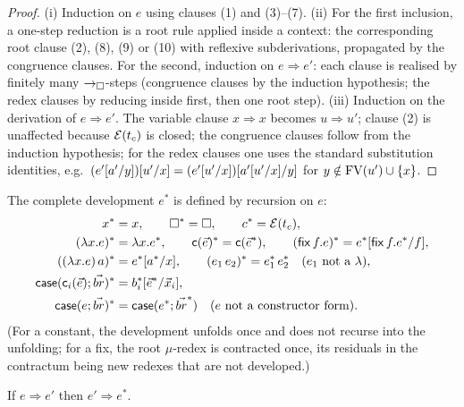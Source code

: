 \begin{proof}
(i) Induction on $e$ using clauses (1) and (3)--(7).  (ii) For the first
inclusion, a one-step reduction is a root rule applied inside a context:
the corresponding root clause (2), (8), (9) or (10) with reflexive
subderivations, propagated by the congruence clauses.  For the second,
induction on $e \Rightarrow e'$: each clause is realised by finitely
many $\rightarrow_{\square}$-steps (congruence clauses by the induction hypothesis; the
redex clauses by reducing inside first, then one root step).  (iii)
Induction on the derivation of $e \Rightarrow e'$.  The variable clause
$x \Rightarrow x$ becomes $u \Rightarrow u'$; clause (2) is unaffected
because $\mathcal{E}(t_c)$ is closed; the congruence clauses follow from the
induction hypothesis; for the redex clauses one uses the standard
substitution identities, e.g.\
$(e'[a'/y])[u'/x] =
(e'[u'/x])[a'[u'/x]/y]$ for $y \notin
\mathrm{FV}(u') \cup \{x\}$.
\end{proof}

\begin{definition}
\label{def:development}
The complete development $e^{\ast}$ is defined by recursion on $e$:
\begin{align*}
  x^{\ast} &= x, \qquad \square^{\ast} = \square, \qquad
  c^{\ast} = \mathcal{E}(t_c),\\
  (\lambda x.e)^{\ast} &= \lambda x.e^{\ast}, \qquad
  \mathsf{c}(\vec{e})^{\ast} = \mathsf{c}(\vec{e}^{\ast}), \qquad
  (\mathsf{fix}\,f.e)^{\ast} =
    e^{\ast}[\mathsf{fix}\,f.e^{\ast}/f],\\
  ((\lambda x.e)\,a)^{\ast} &= e^{\ast}[a^{\ast}/x], \qquad
  (e_1\,e_2)^{\ast} = e_1^{\ast}\,e_2^{\ast} \quad (e_1 \text{ not a }
    \lambda),\\
  \mathsf{case}(\mathsf{c}_i(\vec{e}); \vec{br})^{\ast} &=
    b_i^{\ast}[\vec{e}^{\ast}/\vec{x}_i],\\
  \mathsf{case}(e; \vec{br})^{\ast} &=
    \mathsf{case}(e^{\ast}; \vec{br}^{\ast}) \quad (e \text{ not a
    constructor form}).
\end{align*}
(For a constant, the development unfolds once and does not recurse into
the unfolding; for a fix, the root $\mu$-redex is contracted once, its
residuals in the contractum being new redexes that are not developed.)
\end{definition}

\begin{lemma}
\label{lem:triangle}
If $e \Rightarrow e'$ then $e' \Rightarrow e^{\ast}$.
\end{lemma}

